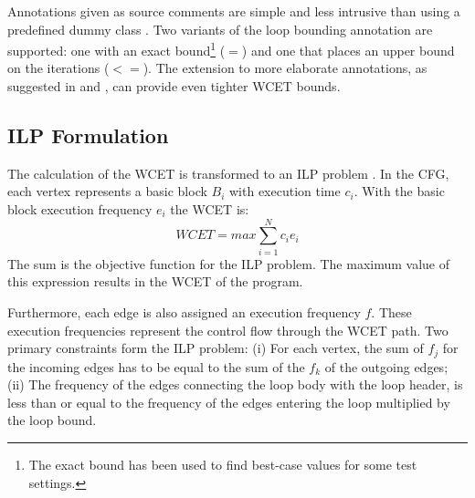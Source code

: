 Annotations given as source comments are simple and less intrusive
than using a predefined dummy class \cite{R:Bernat:2000a}. Two
variants of the loop bounding annotation are supported: one with an
exact bound\footnote{The exact bound has been used to find best-case
values for some test settings.} ($=$) and one that places an upper
bound on the iterations ($<=$). The extension to more elaborate
annotations, as suggested in \cite{pusch:maxt:jnl} and
\cite{R:Bernat:2000a}, can provide even tighter WCET bounds.


\subsection{ILP Formulation} \label{sec:ilp}

The calculation of the WCET is transformed to an ILP problem
\cite{Puschner:JRTS1997}. In the CFG, each vertex represents a basic
block $B_i$ with execution time $c_i$. With the basic block execution
frequency $e_i$ the WCET is:
\begin{equation*}
    WCET = max\sum_{i=1}^{N}c_i e_i
\end{equation*}
The sum is the objective function for the ILP problem. The maximum
value of this expression results in the WCET of the program.

Furthermore, each edge is also assigned an execution frequency $f$.
These execution frequencies represent the control flow through the
WCET path. Two primary constraints form the ILP problem: (i) For each
vertex, the sum of $f_j$ for the incoming edges has to be equal to
the sum of the $f_k$ of the outgoing edges; (ii) The frequency of the
edges connecting the loop body with the loop header, is less than or
equal to the frequency of the edges entering the loop multiplied by
the loop bound.


